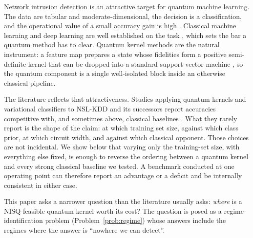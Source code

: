 %
%

\begin{revbody}
Network intrusion detection is an attractive target for quantum machine
learning. The data are tabular and moderate-dimensional, the decision is a
classification, and the operational value of a small accuracy gain is high
\cite{ref24}. Classical machine learning and deep learning are well established
on the task \cite{ref1,ref2,ref3}, which sets the bar a quantum method has to
clear. Quantum kernel methods are the natural instrument: a feature map prepares a
state whose fidelities form a positive semi-definite kernel that can be dropped
into a standard support vector machine \cite{havlicek2019,schuld2019}, so the
quantum component is a single well-isolated block inside an otherwise classical
pipeline.

The literature reflects that attractiveness. Studies applying quantum kernels
and variational classifiers to NSL-KDD \cite{ref4} and its successors
\cite{ref25} report accuracies competitive with, and sometimes above,
classical baselines \cite{ref13,ref14,ref15}. What they rarely report is the shape of the claim: at which training
set size, against which class prior, at which circuit width, and against which
classical opponent. Those choices are not incidental. We show below that varying
only the training-set size, with everything else fixed, is enough to reverse the
ordering between a quantum kernel and every strong classical baseline we tested.
A benchmark conducted at one operating point can therefore report an advantage
or a deficit and be internally consistent in either case.

This paper asks a narrower question than the literature usually asks:
\emph{where} is a NISQ-feasible quantum kernel worth its cost? The question is
posed as a regime-identification problem (Problem~\ref{prob:regime}) whose
answers include the regimes where the answer is ``nowhere we can detect''.


\end{revbody}
